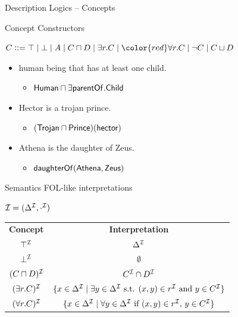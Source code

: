 \documentclass[10pt]{beamer}
\begin{document}
\begin{frame}[fragile]{Description Logics -- Concepts}
  \begin{center}

    \large { Concept Constructors }

    { \normalsize
    $C \grammar \top \mid \bot \mid A \mid C\sqcap D \mid \exists r.C \mid {\color{red} \forall r.C \mid \lnot C \mid C \sqcup D}$
    }

  \end{center}
  \pause
  \begin{itemize}
    \item human being that has at least one child.
      \begin{itemize}
        \item $\mathsf{Human} \sqcap \exists \mathsf{parentOf}.\mathsf{Child}$
      \end{itemize} \pause
      \item Hector is a trojan prince.
      \begin{itemize}
        \item $(\mathsf{Trojan} \sqcap \mathsf{Prince})(\mathsf{hector})$
      \end{itemize} \pause
      \item Athena is the daughter of Zeus.
      \begin{itemize}
        \item $\mathsf{daughterOf}(\mathsf{Athena}, \mathsf{Zeus})$
      \end{itemize}
  \end{itemize}
\end{frame}


\begin{frame}[fragile]{Semantics}
    FOL-like interpretations

    $\mathcal{I} = (\Delta^{\mathcal{I}}, \cdot^{\mathcal{I}})$

    \pause
    \vspace{2mm}

    { \normalsize
    {\renewcommand{\arraystretch}{1.2}
    \begin{table}[ht]
      \begin{tabular}{c c}
        \textbf{Concept} & \textbf{Interpretation} \\
       $\top^\mathcal{I}$ & $\Delta^\mathcal{I}$ \\ 
       $\bot^\mathcal{I}$ & $\emptyset$ \\ 
       $(C\sqcap D)^\mathcal{I}$ & $C^\mathcal{I}\cap D^\mathcal{I}$   \\ 
       $(\exists r.C)^\mathcal{I}$ & $\{x\in\Delta^\mathcal{I} \mid \exists y\in\Delta^\mathcal{I}\textrm{ s.t. }(x,y)\in r^\mathcal{I}\textrm{ and } y\in C^\mathcal{I}\}$    \\ 
       $(\forall r.C)^\mathcal{I}$ & $\{x\in\Delta^\mathcal{I} \mid \forall y\in\Delta^\mathcal{I}\textrm{ if }(x,y)\in r^\mathcal{I}\textrm{, } y\in C^\mathcal{I}\}$  \\ 
      \end{tabular}
      \end{table}
    }
    }
\end{frame}
\end{document}
